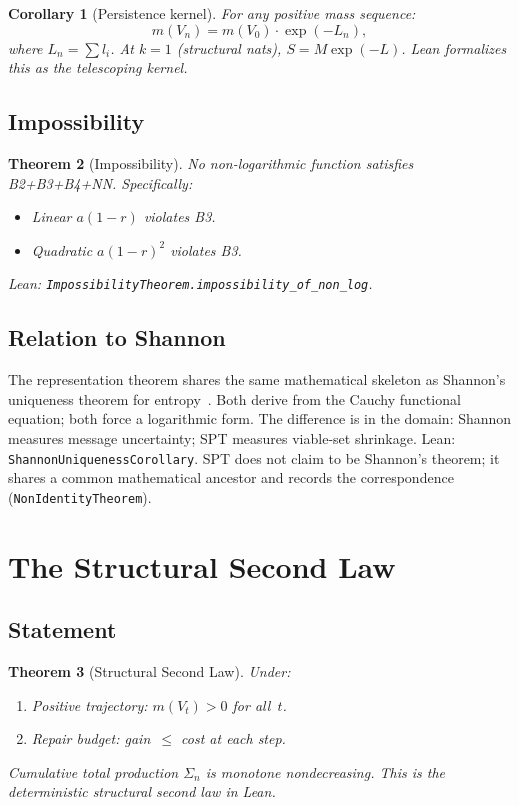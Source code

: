 \documentclass[11pt,a4paper]{article}
\newtheorem{theorem}{Theorem}[section]
\newtheorem{corollary}[theorem]{Corollary}
\begin{document}
\begin{corollary}[Persistence kernel]
For any positive mass sequence:
\[
m(V_n) = m(V_0) \cdot \exp(-L_n),
\]
where $L_n = \sum l_i$. At $k=1$ (structural nats), $S = M\exp(-L)$. Lean formalizes this as the telescoping kernel.
\end{corollary}

\subsection{Impossibility}

\begin{theorem}[Impossibility]\label{thm:impossibility}
No non-logarithmic function satisfies B2+B3+B4+NN. Specifically:
\begin{itemize}
\item Linear $a(1-r)$ violates B3.
\item Quadratic $a(1-r)^2$ violates B3.
\end{itemize}
Lean: \texttt{ImpossibilityTheorem.impossibility\_of\_non\_log}.
\end{theorem}

\subsection{Relation to Shannon}

The representation theorem shares the same mathematical skeleton as Shannon's uniqueness theorem for entropy~\cite{shannon1948}. Both derive from the Cauchy functional equation; both force a logarithmic form. The difference is in the domain: Shannon measures message uncertainty; SPT measures viable-set shrinkage. Lean: \texttt{ShannonUniquenessCorollary}. SPT does not claim to be Shannon's theorem; it shares a common mathematical ancestor and records the correspondence (\texttt{NonIdentityTheorem}).

\section{The Structural Second Law}\label{sec:secondlaw}

\subsection{Statement}

\begin{theorem}[Structural Second Law]\label{thm:secondlaw}
Under:
\begin{enumerate}
\item Positive trajectory: $m(V_t) > 0$ for all~$t$.
\item Repair budget: gain~$\leq$ cost at each step.
\end{enumerate}
Cumulative total production $\Sigma_n$ is monotone nondecreasing. This is the deterministic structural second law in Lean.
\end{theorem}
\end{document}

